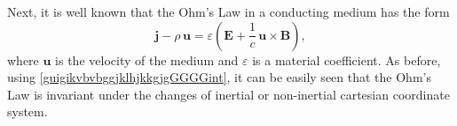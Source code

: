 \documentclass{article}
\theoremstyle{definition}
\theoremstyle{remark}
\renewcommand{\vec}[1]{\mathbf{#1}}
\newcommand{\er}{\eqref}
\newcommand{\er}{\eqref}
\begin{document}
Next, it is well known that the Ohm's Law in a conducting medium has
the form
\begin{equation}\label{vjhfhjtjhjhuyyiyGGint}
\vec j-\rho\,\vec u=\varepsilon\left(\vec E+\frac{1}{c}\,\vec
u\times \vec B\right),
\end{equation}
where $\vec u$ is the velocity of the medium and $\varepsilon$ is a
material coefficient. As before, using
\er{guigikvbvbggjklhjkkgjgGGGGint}, it can be easily seen that the
Ohm's Law is invariant under the changes of inertial or non-inertial
cartesian coordinate system.
\end{document}
